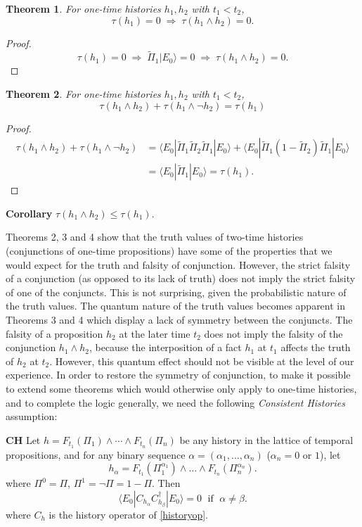\documentclass[12pt,a4paper,reqno]{article}
\newcommand{\linespace}{\vspace{\baselineskip}}
\renewcommand{\(}{\left(}
\renewcommand{\)}{\right)}
\newcommand{\<}{\langle}
\renewcommand{\>}{\rangle}
\newcommand{\impl}{\Longrightarrow}
\newcommand{\Pii}{\widetilde{\Pi}}
\theoremstyle{plain} %
\newtheorem{thm}{Theorem}
\begin{document}
\begin{thm} For one-time histories $h_1,h_2$ with $t_1 < t_2$,
\[
\tau(h_1) = 0 \; \impl\; \tau(h_1\land h_2) = 0.
\]
\end{thm}
\begin{proof}
\[
\tau(h_1) = 0 \;\impl\; \Pii_1|E_0\> = 0 \;\impl\; \tau(h_1\land h_2) = 0.
\]
\end{proof}

\begin{thm} For one-time histories $h_1,h_2$ with $t_1<t_2$,
\[
\tau(h_1\land h_2) + \tau(h_1\land\lnot h_2) = \tau(h_1)
\]
\end{thm}
\begin{proof}
\begin{align*}
\tau(h_1\land h_2) + \tau(h_1\land\lnot h_2) &= \<E_0|\Pii_1\Pii_2\Pii_1|E_0\> +  \<E_0|\Pii_1\(1 - \Pii_2\)\Pii_1|E_0\>\\
&= \<E_0|\Pii_1|E_0\> = \tau(h_1).
\end{align*}
\end{proof}
{\bf Corollary} $\tau(h_1\land h_2) \leq \tau(h_1)$.

\linespace

Theorems 2, 3 and 4 show that the truth values of two-time histories (conjunctions of one-time propositions) have some of the properties that we would expect for the truth and falsity of conjunction. However, the strict falsity of a conjunction (as opposed to its lack of truth) does not imply the strict falsity of one of the conjuncts. This is not surprising, given the probabilistic nature of the truth values. The quantum nature of the truth values becomes apparent in Theorems 3 and 4
which display a lack of symmetry between the conjuncts. The falsity of a proposition $h_2$ at the later time $t_2$ does not imply the falsity of the conjunction $h_1\land h_2$, because the interposition of a fact $h_1$ at $t_1$ affects the truth of $h_2$ at $t_2$. However, this quantum effect should not be visible at the level of our experience. In order to restore the symmetry of conjunction, to make it possible to extend some theorems which would otherwise only apply to one-time histories, and to complete the logic generally, we need the following \emph{Consistent Histories} assumption:

{\bf CH}\hspace{0.5em} Let $h = F_{t_1}(\Pi_1)\land \cdots \land F_{t_n}(\Pi_n)$ be any history in the lattice of temporal propositions, and for any binary sequence $\alpha = (\alpha_1,\ldots ,\alpha_n)$ ($\alpha_n = 0$ or $1$), let
\[
h_\alpha = F_{t_1}(\Pi_1^{\alpha_1})\land \ldots \land F_{t_n}(\Pi_n^{\alpha_n}).
\]
where $\Pi^0 = \Pi$, $\Pi^1 = \lnot\Pi = 1 - \Pi$. Then
\[
\<E_0|C_{h_\alpha} C_{h_\beta}^\dagger|E_0\> = 0 \;\text{ if }\; \alpha \neq \beta.
\]
where $C_h$ is the history operator of \eqref{historyop}.
\end{document}
